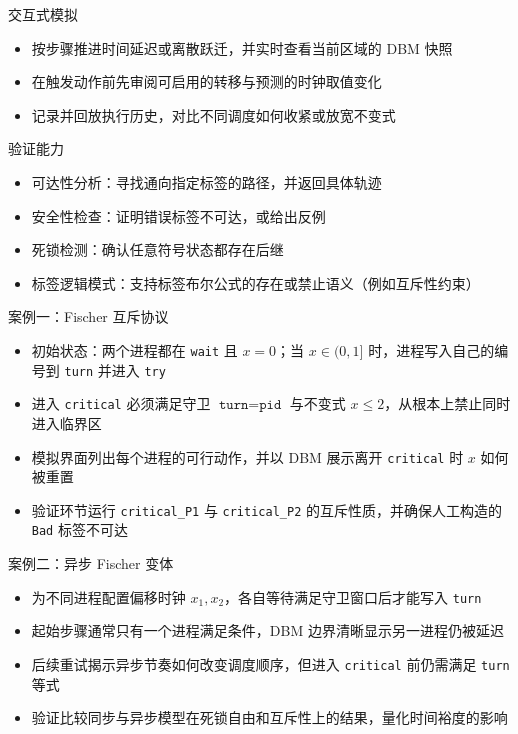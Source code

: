 \documentclass{beamer}
\begin{document}
\begin{frame}{交互式模拟}
  \begin{itemize}
    \item 按步骤推进时间延迟或离散跃迁，并实时查看当前区域的 DBM 快照
    \item 在触发动作前先审阅可启用的转移与预测的时钟取值变化
    \item 记录并回放执行历史，对比不同调度如何收紧或放宽不变式
  \end{itemize}
\end{frame}

\begin{frame}{验证能力}
  \begin{itemize}
    \item 可达性分析：寻找通向指定标签的路径，并返回具体轨迹
    \item 安全性检查：证明错误标签不可达，或给出反例
    \item 死锁检测：确认任意符号状态都存在后继
    \item 标签逻辑模式：支持标签布尔公式的存在或禁止语义（例如互斥性约束）
  \end{itemize}
\end{frame}

\begin{frame}{案例一：Fischer 互斥协议}
  \begin{itemize}
    \item 初始状态：两个进程都在 \texttt{wait} 且 \(x = 0\)；当 \(x \in (0,1]\) 时，进程写入自己的编号到 \texttt{turn} 并进入 \texttt{try}
    \item 进入 \texttt{critical} 必须满足守卫 \(\texttt{turn} = \texttt{pid}\) 与不变式 \(x \le 2\)，从根本上禁止同时进入临界区
    \item 模拟界面列出每个进程的可行动作，并以 DBM 展示离开 \texttt{critical} 时 \(x\) 如何被重置
    \item 验证环节运行 \texttt{critical\_P1} 与 \texttt{critical\_P2} 的互斥性质，并确保人工构造的 \texttt{Bad} 标签不可达
  \end{itemize}
\end{frame}

\begin{frame}{案例二：异步 Fischer 变体}
  \begin{itemize}
    \item 为不同进程配置偏移时钟 \(x_1, x_2\)，各自等待满足守卫窗口后才能写入 \texttt{turn}
    \item 起始步骤通常只有一个进程满足条件，DBM 边界清晰显示另一进程仍被延迟
    \item 后续重试揭示异步节奏如何改变调度顺序，但进入 \texttt{critical} 前仍需满足 \texttt{turn} 等式
    \item 验证比较同步与异步模型在死锁自由和互斥性上的结果，量化时间裕度的影响
  \end{itemize}
\end{frame}
\end{document}
